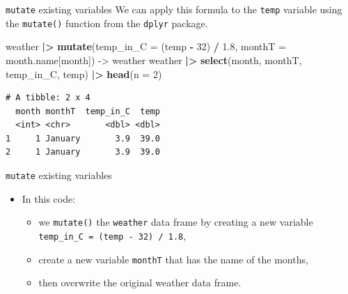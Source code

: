 \documentclass[
  ignorenonframetext,
]{beamer}
\newenvironment{Shaded}{\begin{snugshade}}{\end{snugshade}}
\newcommand{\AttributeTok}[1]{\textcolor[rgb]{0.13,0.29,0.53}{#1}}
\newcommand{\DecValTok}[1]{\textcolor[rgb]{0.00,0.00,0.81}{#1}}
\newcommand{\FloatTok}[1]{\textcolor[rgb]{0.00,0.00,0.81}{#1}}
\newcommand{\FunctionTok}[1]{\textcolor[rgb]{0.13,0.29,0.53}{\textbf{#1}}}
\newcommand{\NormalTok}[1]{#1}
\newcommand{\OtherTok}[1]{\textcolor[rgb]{0.56,0.35,0.01}{#1}}
\newcommand{\SpecialCharTok}[1]{\textcolor[rgb]{0.81,0.36,0.00}{\textbf{#1}}}
\providecommand{\tightlist}{%
  \setlength{\itemsep}{0pt}\setlength{\parskip}{0pt}}
\begin{document}
\begin{frame}[fragile]{\texttt{mutate} existing variables}
\label{mutate-existing-variables-1}
We can apply this formula to the \texttt{temp} variable using the
\texttt{mutate()} function from the \texttt{dplyr} package.

\normalsize

\begin{Shaded}
\begin{Highlighting}[]
\NormalTok{weather }\SpecialCharTok{|\textgreater{}} 
  \FunctionTok{mutate}\NormalTok{(}\AttributeTok{temp\_in\_C =}\NormalTok{ (temp }\SpecialCharTok{{-}} \DecValTok{32}\NormalTok{) }\SpecialCharTok{/} \FloatTok{1.8}\NormalTok{,}
         \AttributeTok{monthT =}\NormalTok{ month.name[month]) }\OtherTok{{-}\textgreater{}}\NormalTok{ weather}
\NormalTok{weather }\SpecialCharTok{|\textgreater{}} \FunctionTok{select}\NormalTok{(month, monthT, temp\_in\_C, temp) }\SpecialCharTok{|\textgreater{}} 
  \FunctionTok{head}\NormalTok{(}\AttributeTok{n =} \DecValTok{2}\NormalTok{)}
\end{Highlighting}
\end{Shaded}

\begin{verbatim}
# A tibble: 2 x 4
  month monthT  temp_in_C  temp
  <int> <chr>       <dbl> <dbl>
1     1 January       3.9  39.0
2     1 January       3.9  39.0
\end{verbatim}

\normalsize
\end{frame}

\begin{frame}[fragile]{\texttt{mutate} existing variables}
\label{mutate-existing-variables-2}
\begin{itemize}
\item
  In this code:

  \begin{itemize}
  \tightlist
  \item
    we \texttt{mutate()} the \texttt{weather} data frame by creating a
    new variable \texttt{temp\_in\_C\ =\ (temp\ -\ 32)\ /\ 1.8},
  \item
    create a new variable \texttt{monthT} that has the name of the
    months,
  \item
    then overwrite the original weather data frame.
  \end{itemize}
\end{itemize}
\end{frame}
\end{document}
